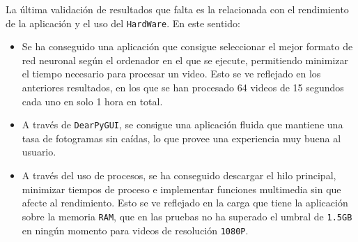 \clearpage

La última validación de resultados que falta es la relacionada con el rendimiento de la aplicación y el uso del \texttt{HardWare}. En este sentido:

\begin{itemize}
    \item Se ha conseguido una aplicación que consigue seleccionar el mejor formato de red neuronal según el ordenador en el que se ejecute, permitiendo minimizar el tiempo necesario para procesar un video. Esto se ve reflejado en 
    los anteriores resultados, en los que se han procesado 64 videos de 15 segundos cada uno en solo 1 hora en total.
    \item A través de \texttt{DearPyGUI}, se consigue una aplicación fluida que mantiene una tasa de fotogramas sin caídas, lo que provee una experiencia muy buena al usuario.
    \item A través del uso de procesos, se ha conseguido descargar el hilo principal, minimizar tiempos de proceso e implementar funciones multimedia sin que afecte al rendimiento. Esto se ve reflejado en la carga que tiene la 
    aplicación sobre la memoria \texttt{RAM}, que en las pruebas no ha superado el umbral de \texttt{1.5GB} en ningún momento para videos de resolución \texttt{1080P}.
\end{itemize}
